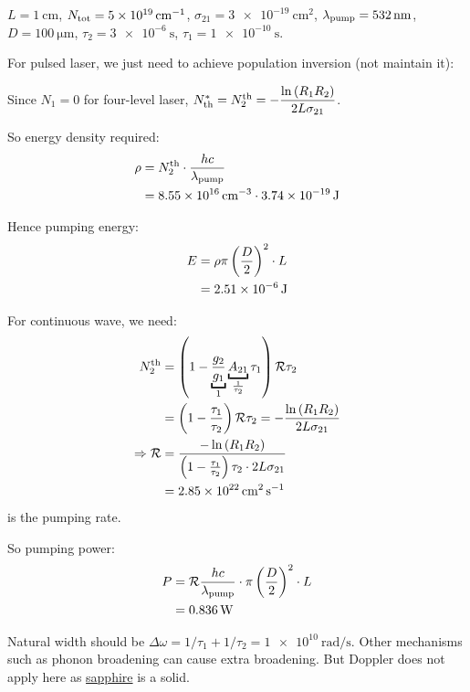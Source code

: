 \begin{parts}
\begin{subparts}
		\subpart $L=\SI{1}{\centi\metre}$, $N_\textnormal{tot}=\SI{5e19}{\per\centi\metre}$, $\sigma_{21}=\SI{3e-19}{\centi\metre\squared}$, $\lambda_\textnormal{pump}=\SI{532}{\nano\metre}$, $D=\SI{100}{\micro\metre}$, $\tau_2=\SI{3e-6}{\second}$, $\tau_1=\SI{1e-10}{\second}$.
		
		For pulsed laser, we just need to achieve population inversion (not maintain it):
		
		Since $N_1 = 0$ for four-level laser, $N^*_\textnormal{th} = N_2^\textnormal{th} = -\dfrac{\ln\left(R_1R_2\right)}{2L\sigma_{21}}$.
		
		So energy density required:
		\begin{align*}
			\rho &= N_2^\textnormal{th} \cdot \frac{hc}{\lambda_\textnormal{pump}} \\
			&= \SI{8.55e16}{\per\centi\metre\cubed} \cdot \SI{3.74e-19}{\joule}
		\end{align*}
		
		Hence pumping energy:
		\begin{align*}
			E &= \rho \pi \left(\frac{D}{2}\right)^2 \cdot L \\
			&= \SI{2.51e-6}{\joule}
		\end{align*}
		
		For continuous wave, we need:
		\begin{align*}
			N_2^\textnormal{th} &= \rbracket{1-\underbracket{\frac{g_2}{g_1}}_{1} \underbracket{A_{21}}_{\frac{1}{\tau_2}} \tau_1} \mathcal{R}\tau_2 \\
			&= \rbracket{1-\frac{\tau_1}{\tau_2}}\mathcal{R}\tau_2 = -\frac{\ln\rbracket{R_1R_2}}{2L\sigma_{21}} \\
			\Rightarrow \mathcal{R} &= \frac{-\ln\rbracket{R_1R_2}}{\rbracket{1-\frac{\tau_1}{\tau_2}}\tau_2 \cdot 2L\sigma_{21}} \\
			&= \SI{2.85e22}{\centi\metre\squared\per\second}
		\end{align*}
		is the pumping rate.
		
		So pumping power:
		\begin{align*}
			P &= \mathcal{R} \frac{hc}{\lambda_\textnormal{pump}} \cdot \pi\left(\frac{D}{2}\right)^2 \cdot L \\
			&= \SI{0.836}{\watt}
		\end{align*}
		
		Natural width should be $\Delta\omega = 1/\tau_1 + 1/\tau_2 = \SI{1e10}{\radian\per\second}$.
		Other mechanisms such as phonon broadening can cause extra broadening.
		But Doppler does not apply here as \underline{sapphire} is a solid.
	\end{subparts}
\end{parts}